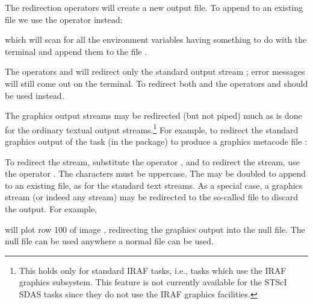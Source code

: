 The \usertype{$>$} redirection operators will create a new output file.
To append to an existing file we use the \usertype{$>>$} operator instead:

\begin{quotation}\noindent
{} 
\end{quotation}

\noindent
which will scan for all the environment variables having something to do with
the terminal and append them to the file .

The operators \usertype{$>$} and \usertype{$>>$} will redirect only the
standard output stream ; error messages will still come
out on the terminal.  To redirect both  and 
the operators \usertype{$>$\&} and \usertype{$>>$\&} should be used instead.

The graphics output streams may be redirected (but not piped) much as is
done for the ordinary textual output streams.\footnote{This holds only for
standard IRAF tasks, i.e., tasks which use the IRAF graphics subsystem.
This feature is not currently available for the STScI SDAS tasks since they
do not use the IRAF graphics facilities.}  For example, to redirect the
standard graphics output of the  task (in the 
package) to produce a graphics metacode file :

\begin{quotation}\noindent
{} 
\end{quotation}

To redirect the  stream, substitute the operator
, and to redirect the  stream, use the
operator .  The characters  must be uppercase.
The \usertype{$>$} may be doubled to append to an existing file, as for
the standard text streams.  As a special case, a graphics stream (or indeed
any stream) may be redirected to the so-called  file
 to discard the output.  For example,

\begin{quotation}\noindent
{} 
\end{quotation}

\noindent
will plot row 100 of image , redirecting the graphics output
into the null file.  The null file can be used anywhere a normal file can be
used.

